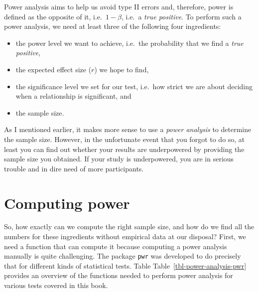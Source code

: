 \documentclass[
  letterpaper,
  DIV=11,
  numbers=noendperiod]{scrreprt}
\begin{document}
Power analysis aims to help us avoid type II errors and, therefore,
power is defined as the opposite of it, i.e.~\(1 - \beta\), i.e.~a
\emph{true positive}. To perform such a power analysis, we need at least
three of the following four ingredients:

\begin{itemize}
\item
  the power level we want to achieve, i.e.~the probability that we find
  a \emph{true positive},
\item
  the expected effect size (\(r\)) we hope to find,
\item
  the significance level we set for our test, i.e.~how strict we are
  about deciding when a relationship is significant, and
\item
  the sample size.
\end{itemize}

As I mentioned earlier, it makes more sense to use a \emph{power
analysis} to determine the sample size. However, in the unfortunate
event that you forgot to do so, at least you can find out whether your
results are underpowered by providing the sample size you obtained. If
your study is underpowered, you are in serious trouble and in dire need
of more participants.

\section{Computing power}\label{sec-computing-power}

So, how exactly can we compute the right sample size, and how do we find
all the numbers for these ingredients without empirical data at our
disposal? First, we need a function that can compute it because
computing a power analysis manually is quite challenging. The package
\texttt{pwr} was developed to do precisely that for different kinds of
statistical tests. Table Table~\ref{tbl-power-analysis-pwr} provides an
overview of the functions needed to perform power analysis for various
tests covered in this book.
\end{document}
